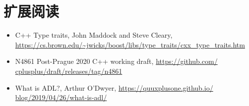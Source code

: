 \section{扩展阅读}
\begin{itemize}
  \item C++ Type traits, John Maddock and Steve Cleary, \url{https://cs.brown.edu/~jwicks/boost/libs/type_traits/cxx_type_traits.htm}
  \item N4861 Post-Prague 2020 C++ working draft, \url{https://github.com/ cplusplus/draft/releases/tag/n4861}
  \item What is ADL?, Arthur O’Dwyer, \url{https://quuxplusone.github.io/ blog/2019/04/26/what-is-adl/}

\end{itemize}